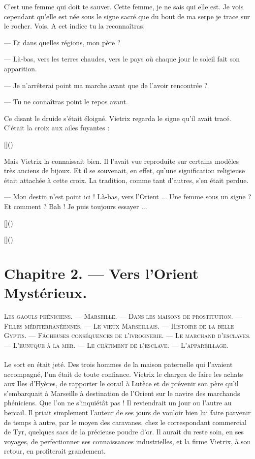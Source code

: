 \documentclass[a4paper, 11pt, oneside, polutonikogreek, french]{article}
\begin{document}
C'est une femme qui doit te sauver. Cette femme, je ne sais qui elle est. Je vois cependant qu'elle est née sous le signe sacré que du bout de ma serpe je trace sur le rocher. Vois. A cet indice tu la reconnaîtras.

--- Et dans quelles régions, mon père ?

--- Là-bas, vers les terres chaudes, vers le pays où chaque jour le soleil fait son apparition.

--- Je n'arrêterai point ma marche avant que de l'avoir rencontrée ?

--- Tu ne connaîtras point le repos avant.

Ce disant le druide s'était éloigné. Vietrix regarda le signe qu'il avait tracé. C'était la croix aux ailes fuyantes :

[]()

Mais Vietrix la connaissait bien. Il l'avait vue reproduite sur certains modèles très anciens de bijoux. Et il se souvenait, en effet, qu'une signification religieuse était attachée à cette croix. La tradition, comme tant d'autres, s'en était perdue.

--- Mon destin n'est point ici ! Là-bas, vers l'Orient ... Une femme sous un signe ? Et comment ? Bah ! Je puis toujours essayer ...

[]()

[]()
\clearpage
\section{Chapitre 2. --- Vers l'Orient Mystérieux.}
\begin{center}
\scshape
\small
Les gaouls phéniciens. --- Marseille. --- Dans les maisons de prostitution. --- Filles méditerranéennes. --- Le vieux Marseillais. --- Histoire de la belle Gyptis. --- Fâcheuses conséquences de l'ivrognerie. --- Le marchand d'esclaves. --- L'eunuque à la mer. --- Le châtiment de l'esclave. --- L'appareillage.
\end{center}
\paragraph{}
Le sort en était jeté. Des trois hommes de la maison paternelle qui l'avaient accompagné, l'un était de toute confiance. Vietrix le chargea de faire les achats aux Iles d'Hyères, de rapporter le corail à Lutèce et de prévenir son père qu'il s'embarquait à Marseille à destination de l'Orient sur le navire des marchands phéniciens. Que l'on ne s'inquiétât pas ! Il reviendrait un jour ou l'autre au bercail. Il priait simplement l'auteur de ses jours de vouloir bien lui faire parvenir de temps à autre, par le moyen des caravanes, chez le correspondant commercial de Tyr, quelques sacs de la précieuse poudre d'or. Il aurait du reste soin, en ses voyages, de perfectionner ses connaissances industrielles, et la firme Vietrix, à son retour, en profiterait grandement.
\end{document}
